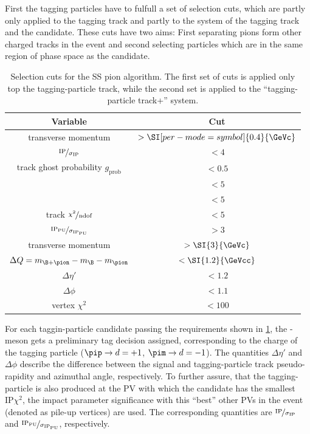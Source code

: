 First the tagging particles have to fulfull a set of selection cuts, which are partly only applied to the tagging track and partly to the system of the tagging track and the \B candidate. These cuts have two aims:
First separating pions form other charged tracks in the event and second selecting particles which are in the same region of phase space as the \B candidate.
\begin{table}[tbp]
	\centering
	\caption{Selection cuts for the SS pion algorithm.
	The first set of cuts is applied only top the tagging-particle track, while the second set is applied to the \enquote{tagging-particle track+\B} system.}
	\begin{tabular}{cc}
		\toprule
		Variable & Cut \\
		\midrule
		transverse momentum \pt 											& $>\SI[per-mode=symbol]{0.4}{\GeVc}$ \\
		$\nicefrac{\text{IP}}{\sigma_{\text{IP}}}$							& $<4$ \\
		track ghost probability $g_{\text{prob}}$ 							& $<0.5$ \\
		\dllppi 															& $<5$ \\
		\dllkpi 															& $<5$ \\
		track $\nicefrac{\chi^2}{\text{ndof}}$ 								& $<5$ \\
		$\nicefrac{\text{IP}_{\text{PU}}}{\sigma_{\text{IP}_{\text{PU}}}}$ 	& $>3$ \\
		\midrule
		transverse momentum \pt 					& $>\SI{3}{\GeVc}$ \\
		$\Delta Q=m_{\B+\pion}-m_{\B}-m_{\pion}$ 	& $<\SI{1.2}{\GeVcc}$ \\
		$\Delta\eta'$								& $<1.2$ \\
		$\Delta\phi$								& $<1.1$ \\
		vertex $\chi^2$ 							& $<100$ \\
		\bottomrule
	\end{tabular}
	\label{tab:SSPionselectionCuts}
\end{table}
For each taggin-particle candidate passing the requirements shown in \cref{tab:SSPionselectionCuts}, the \B-meson gets a preliminary tag decision assigned, corresponding to the charge of the tagging particle ($\pip\rightarrow d=+1$, $\pim\rightarrow d=-1$).
The quantities $\Delta\eta'$ and $\Delta\phi$ describe the difference between the signal and tagging-particle track pseudo-rapidity and azimuthal angle, respectively.
To further assure, that the tagging-particle is also produced at the \ac{PV} with which the \B candidate has the smallest $\text{IP}\chi^2$, the impact parameter significance with this \enquote{best} other PVs in the event (denoted as pile-up vertices) are used.
The corresponding quantities are $\nicefrac{\text{IP}}{\sigma_{\text{IP}}}$ and $\nicefrac{\text{IP}_{\text{PU}}}{\sigma_{\text{IP}_{\text{PU}}}}$, respectively.

